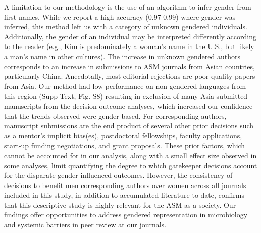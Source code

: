 \documentclass[11pt,]{article}
\begin{document}
A limitation to our methodology is the use of an algorithm to infer
gender from first names. While we report a high accuracy (0.97-0.99)
where gender was inferred, this method left us with a category of
unknown gendered individuals. Additionally, the gender of an individual
may be interpreted differently according to the reader (e.g., Kim is
predominately a woman's name in the U.S., but likely a man's name in
other cultures). The increase in unknown gendered authors corresponds to
an increase in submissions to ASM journals from Asian countries,
particularly China. Anecdotally, most editorial rejections are poor
quality papers from Asia. Our method had low performance on non-gendered
languages from this region (Supp Text, Fig. S8) resulting in exclusion
of many Asia-submitted manuscripts from the decision outcome analyses,
which increased our confidence that the trends observed were
gender-based. For corresponding authors, manuscript submissions are the
end product of several other prior decisions such as a mentor's implicit
bias(es), postdoctoral fellowships, faculty applications, start-up
funding negotiations, and grant proposals. These prior factors, which
cannot be accounted for in our analysis, along with a small effect size
observed in some analyses, limit quantifying the degree to which
gatekeeper decisions account for the disparate gender-influenced
outcomes. However, the consistency of decisions to benefit men
corresponding authors over women across all journals included in this
study, in addition to accumulated literature to-date, confirms that this
descriptive study is highly relevant for the ASM as a society. Our
findings offer opportunities to address gendered representation in
microbiology and systemic barriers in peer review at our journals.
\end{document}
